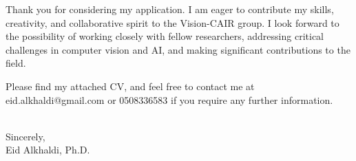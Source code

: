 \documentclass[11pt]{article}
\begin{document}
Thank you for considering my application. I am eager to contribute my
skills, creativity, and collaborative spirit to the Vision-CAIR
group. I look forward to the possibility of working closely with
fellow researchers, addressing critical challenges in computer vision
and AI, and making significant contributions to the field.

Please find my attached CV, and feel free to contact me at \\[0pt]
eid.alkhaldi@gmail.com or 0508336583 if you require any further
information.  


\noindent
\\[0pt]
Sincerely, \\[0pt]
Eid Alkhaldi, Ph.D.
\end{document}
